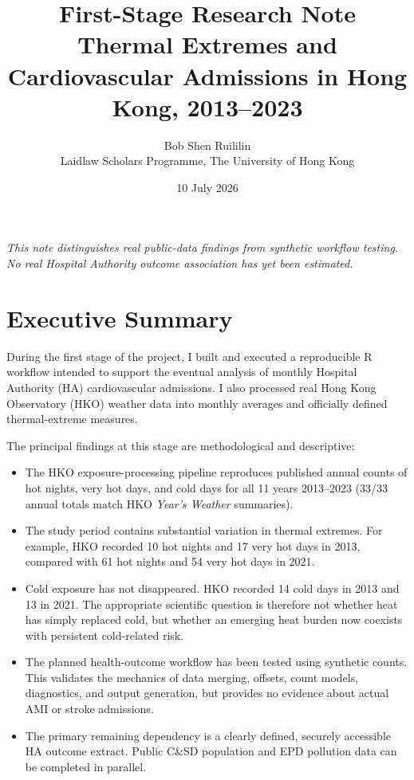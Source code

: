 \documentclass[11pt]{article}
\title{
    \textbf{First-Stage Research Note}\\[0.25em]
    \large Thermal Extremes and Cardiovascular Admissions in Hong Kong,
    2013--2023
}
\author{
    Bob Shen Ruililin\\
    Laidlaw Scholars Programme, The University of Hong Kong
}
\date{10 July 2026}
\begin{document}
\maketitle

\begin{center}
\small
\textit{
This note distinguishes real public-data findings from synthetic workflow
testing. No real Hospital Authority outcome association has yet been estimated.
}
\end{center}

\section*{Executive Summary}

During the first stage of the project, I built and executed a reproducible
R workflow intended to support the eventual analysis of monthly Hospital
Authority (HA) cardiovascular admissions. I also processed real Hong Kong
Observatory (HKO) weather data into monthly averages and officially defined
thermal-extreme measures.

The principal findings at this stage are methodological and descriptive:

\begin{itemize}
    \item The HKO exposure-processing pipeline reproduces published annual
    counts of hot nights, very hot days, and cold days for all 11 years
    2013--2023 (33/33 annual totals match HKO \textit{Year's Weather} summaries).
    \item The study period contains substantial variation in thermal extremes.
    For example, HKO recorded 10 hot nights and 17 very hot days in 2013,
    compared with 61 hot nights and 54 very hot days in 2021.
    \item Cold exposure has not disappeared. HKO recorded 14 cold days in
    2013 and 13 in 2021. The appropriate scientific question is therefore not
    whether heat has simply replaced cold, but whether an emerging heat burden
    now coexists with persistent cold-related risk.
    \item The planned health-outcome workflow has been tested using synthetic
    counts. This validates the mechanics of data merging, offsets, count
    models, diagnostics, and output generation, but provides no evidence about
    actual AMI or stroke admissions.
    \item The primary remaining dependency is a clearly defined, securely
    accessible HA outcome extract. Public C\&SD population and EPD pollution
    data can be completed in parallel.
\end{itemize}
\end{document}
